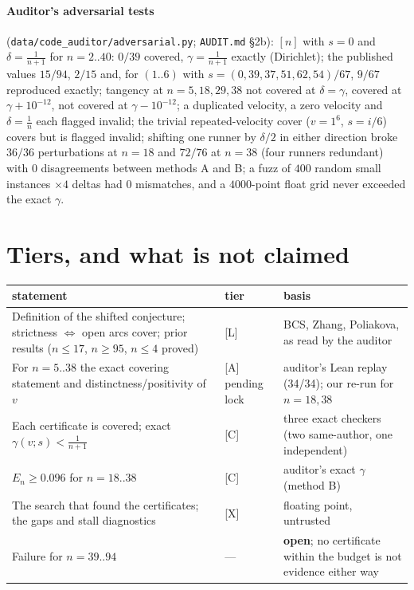 \documentclass[10pt]{article}
\newcommand{\tier}[1]{\textsf{[#1]}}
\newcommand{\tA}{\tier{A}}
\newcommand{\tL}{\tier{L}}
\newcommand{\tC}{\tier{C}}
\newcommand{\tX}{\tier{X}}
\begin{document}
\paragraph{Auditor's adversarial tests} (\texttt{data/code\_auditor/adversarial.py}; \texttt{AUDIT.md} \S2b): $[n]$ with $s=0$ and $\delta=\frac1{n+1}$ for $n=2..40$: $0/39$ covered, $\gamma=\frac1{n+1}$ exactly (Dirichlet); the published values $15/94$, $2/15$ and, for $(1..6)$ with $s=(0,39,37,51,62,54)/67$, $9/67$ reproduced exactly; tangency at $n=5,18,29,38$ not covered at $\delta=\gamma$, covered at $\gamma+10^{-12}$, not covered at $\gamma-10^{-12}$; a duplicated velocity, a zero velocity and $\delta=\frac1n$ each flagged invalid; the trivial repeated-velocity cover ($v=1^6$, $s=i/6$) covers but is flagged invalid; shifting one runner by $\delta/2$ in either direction broke $36/36$ perturbations at $n=18$ and $72/76$ at $n=38$ (four runners redundant) with $0$ disagreements between methods A and B; a fuzz of $400$ random small instances $\times4$ deltas had $0$ mismatches, and a $4000$-point float grid never exceeded the exact $\gamma$.

\section{Tiers, and what is not claimed}\label{sec:tiers}
\begin{center}\small\begin{tabular}{p{6.4cm}p{1.9cm}p{4.8cm}}\toprule
statement & tier & basis\\\midrule
Definition of the shifted conjecture; strictness $\Leftrightarrow$ open arcs cover; prior results ($n\le17$, $n\ge95$, $n\le4$ proved) & \tL & BCS, Zhang, Poliakova, as read by the auditor\\
For $n=5..38$ the exact covering statement and distinctness/positivity of $v$ & \tA{} pending lock & auditor's Lean replay (34/34); our re-run for $n=18,38$\\
Each certificate is covered; exact $\gamma(v;s)<\frac1{n+1}$ & \tC & three exact checkers (two same-author, one independent)\\
$E_n\ge0.096$ for $n=18..38$ & \tC & auditor's exact $\gamma$ (method B)\\
The search that found the certificates; the gaps and stall diagnostics & \tX & floating point, untrusted\\
Failure for $n=39..94$ & --- & \textbf{open}; no certificate within the budget is not evidence either way\\\bottomrule
\end{tabular}\end{center}
\end{document}
